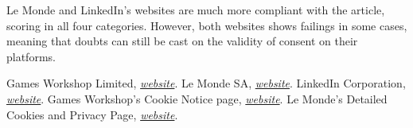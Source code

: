 \documentclass[twocolumn, letterpaper]{scrartcl}
\begin{document}
	Le Monde and LinkedIn's websites are much more compliant with the article, scoring in all four categories. However, both websites shows failings in some cases, meaning that doubts can still be cast on the validity of consent on their platforms.
	
       
    \begin{thebibliography}{9}

    	Games Workshop Limited, \textit{\href{https://www.games-workshop.com/en-US/Home}{website}}.
    	Le Monde SA, \textit{\href{https://www.lemonde.fr/}{website}}.
    	LinkedIn Corporation, \textit{\href{https://www.linkedin.com/}{website}}.
    	Games Workshop's Cookie Notice page, \textit{\href{https://www.games-workshop.com/en-EU/Cookie-Notice}{website}}.
    	Le Monde's Detailed Cookies and Privacy Page, \textit{\href{https://www.lemonde.fr/confidentialite/}{website}}.

    \end{thebibliography}
\end{document}
